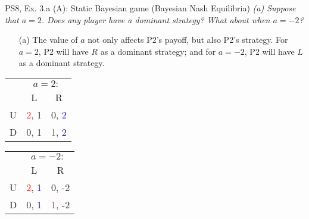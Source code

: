 \begin{frame}{PS8, Ex. 3.a (A): Static Bayesian game (Bayesian Nash Equilibria)}
    \textit{(a) Suppose that $a = 2$. Does any player have a dominant strategy? What about when $a = -2$?}
    \vspace{-8pt}
    \begin{multicols}{2}
      \begin{itemize}
      \item[(a)] The value of $a$ not only affects P2's payoff, but also P2's strategy. For $a=2$, P2 will have $R$ as a dominant strategy; and for $a=-2$, P2 will have $L$ as a dominant strategy.
      \end{itemize}
      \vfill\null\columnbreak
      \begin{table}
          \begin{tabular}{l|c|c|}
          \multicolumn{1}{c}{} & \multicolumn{2}{c}{$a=2:$} \\
          \multicolumn{1}{c}{} & \multicolumn{1}{c}{L} & \multicolumn{1}{c}{\color{blue}R} \\\cline{2-3}
          U & \textcolor{red}{2}, 1 & 0, \textcolor{blue}{2} \\\cline{2-3}
          D & 0, 1 & \textcolor{red}{1}, \textcolor{blue}{2} \\\cline{2-3}
        \end{tabular}
      \end{table}
      \vspace{-8pt}
      \begin{table}
        \begin{tabular}{l|c|c|}
          \multicolumn{1}{c}{} & \multicolumn{2}{c}{$a=-2:$} \\
          \multicolumn{1}{c}{} & \multicolumn{1}{c}{\color{blue}L} & \multicolumn{1}{c}{R} \\\cline{2-3}
          U & \textcolor{red}{2}, \textcolor{blue}{1} & 0, -2 \\\cline{2-3}
          D & 0, \textcolor{blue}{1} & \textcolor{red}{1}, -2 \\\cline{2-3}
        \end{tabular}
      \end{table}
      \vfill\null
    \end{multicols}
\end{frame}


